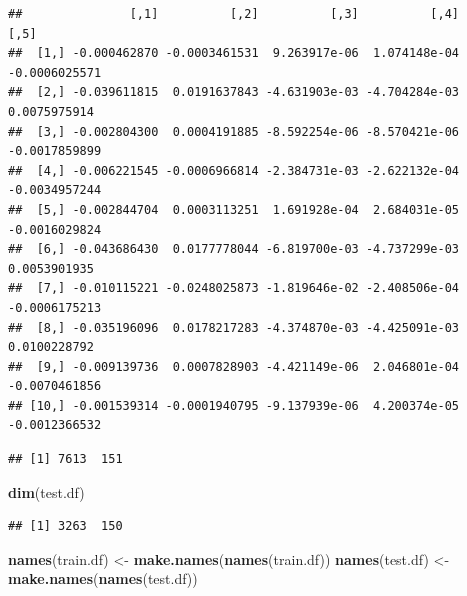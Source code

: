 \documentclass[
]{article}
\newenvironment{Shaded}{\begin{snugshade}}{\end{snugshade}}
\newcommand{\DataTypeTok}[1]{\textcolor[rgb]{0.13,0.29,0.53}{#1}}
\newcommand{\DecValTok}[1]{\textcolor[rgb]{0.00,0.00,0.81}{#1}}
\newcommand{\KeywordTok}[1]{\textcolor[rgb]{0.13,0.29,0.53}{\textbf{#1}}}
\newcommand{\NormalTok}[1]{#1}
\newcommand{\OperatorTok}[1]{\textcolor[rgb]{0.81,0.36,0.00}{\textbf{#1}}}
\newcommand{\StringTok}[1]{\textcolor[rgb]{0.31,0.60,0.02}{#1}}
\begin{document}
\begin{verbatim}
##               [,1]          [,2]          [,3]          [,4]          [,5]
##  [1,] -0.000462870 -0.0003461531  9.263917e-06  1.074148e-04 -0.0006025571
##  [2,] -0.039611815  0.0191637843 -4.631903e-03 -4.704284e-03  0.0075975914
##  [3,] -0.002804300  0.0004191885 -8.592254e-06 -8.570421e-06 -0.0017859899
##  [4,] -0.006221545 -0.0006966814 -2.384731e-03 -2.622132e-04 -0.0034957244
##  [5,] -0.002844704  0.0003113251  1.691928e-04  2.684031e-05 -0.0016029824
##  [6,] -0.043686430  0.0177778044 -6.819700e-03 -4.737299e-03  0.0053901935
##  [7,] -0.010115221 -0.0248025873 -1.819646e-02 -2.408506e-04 -0.0006175213
##  [8,] -0.035196096  0.0178217283 -4.374870e-03 -4.425091e-03  0.0100228792
##  [9,] -0.009139736  0.0007828903 -4.421149e-06  2.046801e-04 -0.0070461856
## [10,] -0.001539314 -0.0001940795 -9.137939e-06  4.200374e-05 -0.0012366532
\end{verbatim}

\begin{Shaded}
\end{Shaded}

\begin{verbatim}
## [1] 7613  151
\end{verbatim}

\begin{Shaded}
\begin{Highlighting}[]
\KeywordTok{dim}\NormalTok{(test.df)}
\end{Highlighting}
\end{Shaded}

\begin{verbatim}
## [1] 3263  150
\end{verbatim}

\begin{Shaded}
\begin{Highlighting}[]
\KeywordTok{names}\NormalTok{(train.df) <-}\StringTok{ }\KeywordTok{make.names}\NormalTok{(}\KeywordTok{names}\NormalTok{(train.df))}
\KeywordTok{names}\NormalTok{(test.df) <-}\StringTok{ }\KeywordTok{make.names}\NormalTok{(}\KeywordTok{names}\NormalTok{(test.df))}
\end{Highlighting}
\end{Shaded}
\end{document}
